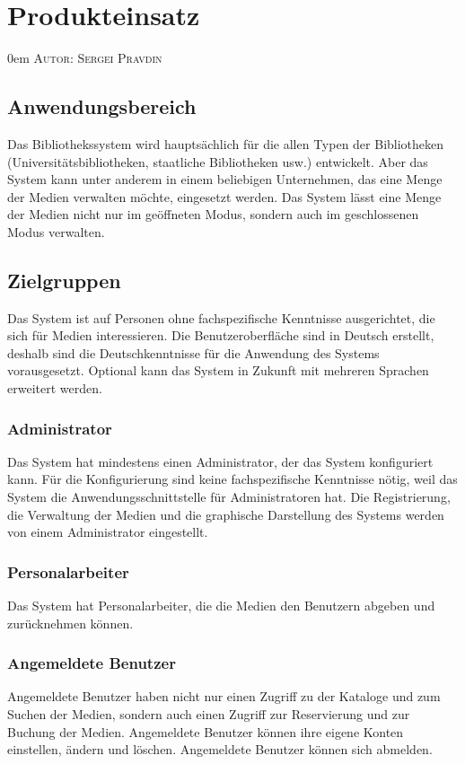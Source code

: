 \documentclass{article}
\makeatletter
\newcommand{\sectionauthor}[1]{
	{\parindent 0em \large \scshape Autor: #1 \par \nobreak \vspace*{2em}}
	\@afterheading
}
\makeatother
\begin{document}
\newpage

\section{Produkteinsatz} %
\sectionauthor{Sergei Pravdin}
\subsection{Anwendungsbereich}
Das Bibliothekssystem wird hauptsächlich für die allen Typen der Bibliotheken (Universitätsbibliotheken, staatliche Bibliotheken usw.) entwickelt. Aber das System kann unter anderem in einem beliebigen Unternehmen, das eine Menge der Medien verwalten möchte, eingesetzt werden. Das System lässt eine Menge der Medien nicht nur im geöffneten Modus, sondern auch im geschlossenen Modus verwalten.
\subsection{Zielgruppen}
Das System ist auf Personen ohne fachspezifische Kenntnisse ausgerichtet, die sich für Medien interessieren. Die Benutzeroberfläche sind in Deutsch erstellt, deshalb sind die Deutschkenntnisse für die Anwendung des Systems vorausgesetzt. Optional kann das System in Zukunft mit mehreren Sprachen erweitert werden.
\subsubsection{Administrator}
Das System hat mindestens einen Administrator, der das System konfiguriert kann. Für die Konfigurierung sind keine fachspezifische Kenntnisse nötig, weil das System die Anwendungsschnittstelle für Administratoren hat. Die Registrierung, die Verwaltung der Medien und die graphische Darstellung des Systems werden von einem Administrator eingestellt.
\subsubsection{Personalarbeiter}
Das System hat Personalarbeiter, die die Medien den Benutzern abgeben und zurücknehmen können.
\subsubsection{Angemeldete Benutzer}
Angemeldete Benutzer haben nicht nur einen Zugriff zu der Kataloge und zum Suchen der Medien, sondern auch einen Zugriff zur Reservierung und zur Buchung der Medien. Angemeldete Benutzer können ihre eigene Konten einstellen, ändern und löschen. Angemeldete Benutzer können sich abmelden.
\end{document}
